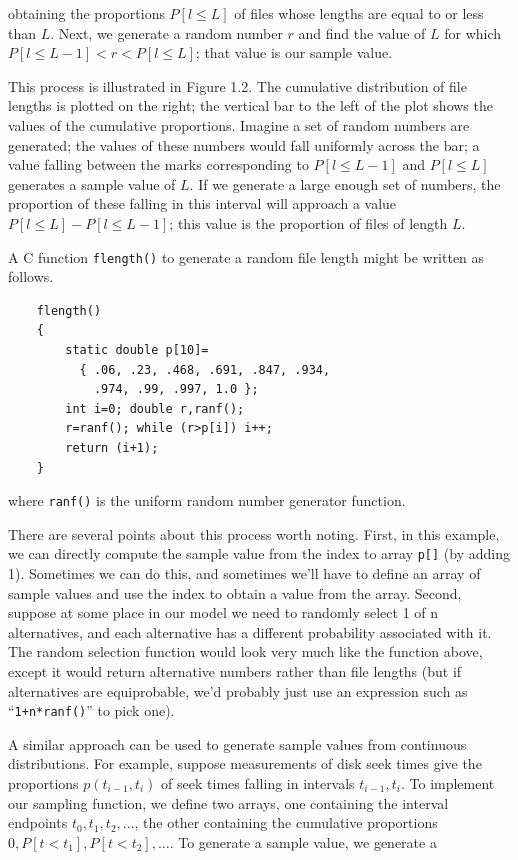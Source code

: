 \noindent obtaining the proportions $P[l\leq L]$ of files whose lengths are equal to or
less than $L$. Next, we generate a random number $r$ and find the value of $L$
for which $P[l\leq L-1]<r<P[l\leq L]$; that value is our sample value.

This process is illustrated in Figure 1.2. The cumulative distribution of file
lengths is plotted on the right; the vertical bar to the left of the plot shows
the values of the cumulative proportions. Imagine a set of random numbers are
generated; the values of these numbers would fall uniformly across the bar; a
value falling between the marks corresponding to $P[l\leq L-1]$ and
$P[l\leq L]$ generates a sample value of $L$. If we generate a large enough set
of numbers, the proportion of these falling in this interval will approach a
value $P[l\leq L]-P[l\leq L-1]$; this value is the proportion of files of length $L$.

A C function \texttt{flength()} to generate a random file length might be written
as follows.
\begin{verbatim}
    flength()
    {
        static double p[10]=
          { .06, .23, .468, .691, .847, .934,
            .974, .99, .997, 1.0 };
        int i=0; double r,ranf();
        r=ranf(); while (r>p[i]) i++;
        return (i+1);
    }
\end{verbatim}
where \texttt{ranf()} is the uniform random number generator function.

There are several points about this process worth noting. First, in this
example, we can directly compute the sample value from the index to array
\texttt{p[]} (by adding 1). Sometimes we can do this, and sometimes we'll have
to define an array of sample values and use the index to obtain a value from the
array. Second, suppose at some place in our model we need to randomly select 1
of n alternatives, and each alternative has a different probability associated
with it. The random selection function would look very much like the function
above, except it would return alternative numbers rather than file lengths (but
if alternatives are equiprobable, we'd probably just use an expression such as
``\texttt{1+n*ranf()}'' to pick one).

A similar approach can be used to generate sample values from continuous
distributions. For example, suppose measurements of disk seek times give the
proportions $p(t_{i-1},t_i)$ of seek times falling in intervals $t_{i-1},t_i$.
To implement our sampling function, we define two arrays, one containing the
interval endpoints $t_0,t_1,t_2,\ldots$, the other containing the cumulative
proportions $0,P[t<t_1],P[t<t_2],\ldots$. To generate a sample value, we generate a

